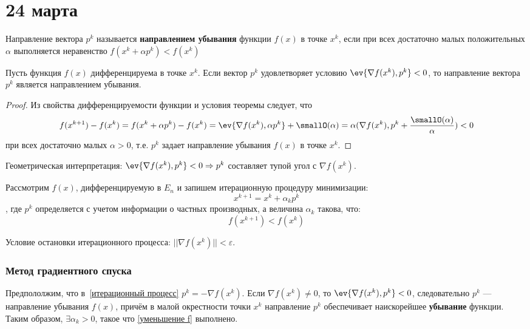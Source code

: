 \chapter{24 марта}

\begin{definition}
    Направление вектора \(p^k\) называется \textbf{направлением убывания} функции \(f(x)\) в точке \(x^k\), если при всех достаточно малых положительных \(\alpha\) выполняется неравенство \(f(x^k + \alpha p^k) < f(x^k)\)
\end{definition}

\begin{theorem}
    Пусть функция \(f(x)\) дифференцируема в точке \(x^k\). Если вектор \(p^k\) удовлетворяет условию \(\ev{\nabla f(x^k), p^k} < 0\), то направление вектора \(p^k\) является направлением убывания.
\end{theorem}
\begin{proof}
    Из свойства дифференцируемости функции и условия теоремы следует, что
    \[f(x^{k + 1}) - f(x^k) = f(x^k + \alpha p^k) - f(x^k) = \ev{\nabla f(x^k), \alpha p^k} + \smallO(\alpha) = \alpha(\nabla f(x^k), p^k + \frac{\smallO(\alpha)}{\alpha} ) < 0\]
    при всех достаточно малых \(\alpha > 0\), т.е. \(p^k\) задает направление убывания \(f(x)\) в точке \(x^k\).
\end{proof}

Геометрическая интерпретация: \(\ev{\nabla f(x^k), p^k} < 0 \Rightarrow p^k\) составляет тупой угол с \(\nabla f(x^k)\).

Рассмотрим \(f(x)\), дифференцируемую в \(E_n\) и запишем итерационную процедуру минимизации:
\begin{equation}
    x^{k + 1} = x^k + \alpha_k p^k
    \label{итерационный процесс}
\end{equation}
, где \(p^k\) определяется с учетом информации о частных производных, а величина \(\alpha_k\) такова, что:
\begin{equation}
    f(x^{k + 1}) < f(x^k)
    \label{уменьшение f}
\end{equation}

Условие остановки итерационного процесса: \(||\nabla f(x^k)|| < \varepsilon\).

\subsection{Метод градиентного спуска}

Предпололжим, что в~\eqref{итерационный процесс} \(p^k = - \nabla f(x^k)\). Если \(\nabla f(x^k) \neq 0\), то \(\ev{\nabla f(x^k), p^k} < 0\), следовательно \(p^k\) --- направление убывания \(f(x)\), причём в малой окрестности точки \(x^k\) направление \(p^k\) обеспечивает наискорейшее \textbf{убывание} функции. Таким образом, \(\exists \alpha_k > 0\), такое что \eqref{уменьшение f} выполнено.

